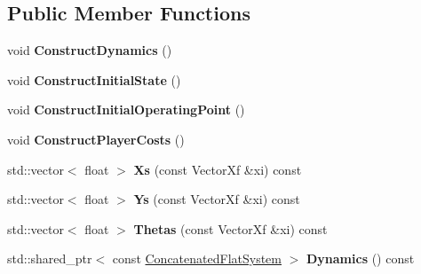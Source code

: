 \subsection*{Public Member Functions}
\begin{DoxyCompactItemize}
\item 
void {\bfseries Construct\+Dynamics} ()\hypertarget{classilqgames_1_1_flat_roundabout_merging_example_a5f405d29f89975ba91cdea184e9253ee}{}\label{classilqgames_1_1_flat_roundabout_merging_example_a5f405d29f89975ba91cdea184e9253ee}

\item 
void {\bfseries Construct\+Initial\+State} ()\hypertarget{classilqgames_1_1_flat_roundabout_merging_example_adb289fa37b235aaf17229088e36bf0ea}{}\label{classilqgames_1_1_flat_roundabout_merging_example_adb289fa37b235aaf17229088e36bf0ea}

\item 
void {\bfseries Construct\+Initial\+Operating\+Point} ()\hypertarget{classilqgames_1_1_flat_roundabout_merging_example_a0d45ae5004e887af6480368134281275}{}\label{classilqgames_1_1_flat_roundabout_merging_example_a0d45ae5004e887af6480368134281275}

\item 
void {\bfseries Construct\+Player\+Costs} ()\hypertarget{classilqgames_1_1_flat_roundabout_merging_example_a4f82243cdd8b8d6dfa961cd19162c65e}{}\label{classilqgames_1_1_flat_roundabout_merging_example_a4f82243cdd8b8d6dfa961cd19162c65e}

\item 
std\+::vector$<$ float $>$ {\bfseries Xs} (const Vector\+Xf \&xi) const \hypertarget{classilqgames_1_1_flat_roundabout_merging_example_a19509a51bc48488fad8eb10c979004e7}{}\label{classilqgames_1_1_flat_roundabout_merging_example_a19509a51bc48488fad8eb10c979004e7}

\item 
std\+::vector$<$ float $>$ {\bfseries Ys} (const Vector\+Xf \&xi) const \hypertarget{classilqgames_1_1_flat_roundabout_merging_example_a0f9ec2bd40585eed90f7e6b73d31c1a1}{}\label{classilqgames_1_1_flat_roundabout_merging_example_a0f9ec2bd40585eed90f7e6b73d31c1a1}

\item 
std\+::vector$<$ float $>$ {\bfseries Thetas} (const Vector\+Xf \&xi) const \hypertarget{classilqgames_1_1_flat_roundabout_merging_example_a389cbee0a71f7149c7550a5ea39201a2}{}\label{classilqgames_1_1_flat_roundabout_merging_example_a389cbee0a71f7149c7550a5ea39201a2}

\item 
std\+::shared\+\_\+ptr$<$ const \hyperlink{classilqgames_1_1_concatenated_flat_system}{Concatenated\+Flat\+System} $>$ {\bfseries Dynamics} () const \hypertarget{classilqgames_1_1_flat_roundabout_merging_example_abb8e4df38141924f3072e9151b6b349e}{}\label{classilqgames_1_1_flat_roundabout_merging_example_abb8e4df38141924f3072e9151b6b349e}

\end{DoxyCompactItemize}
